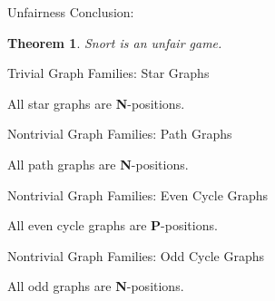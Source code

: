 \documentclass[mathserif]{beamer}
\newtheorem{thm}{Theorem}
\begin{document}
\begin{frame}{Unfairness}
	Conclusion:
	\begin{thm}
		Snort is an unfair game.
	\end{thm}
\end{frame}

\begin{frame}{Trivial Graph Families: Star Graphs}
	\begin{center}
		All star graphs are \textbf{N}-positions.
	\end{center}
	\vfill
	\begin{figure}[h]
		\centering
		\begin{tikzpicture}
			
		\end{tikzpicture}
	\end{figure}
\end{frame}

\begin{frame}{Nontrivial Graph Families: Path Graphs}
	\begin{center}
		All path graphs are \textbf{N}-positions.
	\end{center}
	\vfill
	\begin{figure}[h]
		\centering
		\begin{tikzpicture}
			
		\end{tikzpicture}
	\end{figure}
\end{frame}

\begin{frame}{Nontrivial Graph Families: Even Cycle Graphs}
	\begin{center}
		All even cycle graphs are \textbf{P}-positions.
	\end{center}
	\vfill
	\begin{figure}[h]
		\centering
		\begin{tikzpicture}
			
		\end{tikzpicture}
	\end{figure}
\end{frame}

\begin{frame}{Nontrivial Graph Families: Odd Cycle Graphs}
	\begin{center}
		All odd graphs are \textbf{N}-positions.
	\end{center}
	\vfill
	\begin{figure}[h]
		\centering
		\begin{tikzpicture}
			
		\end{tikzpicture}
	\end{figure}
\end{frame}
\end{document}
